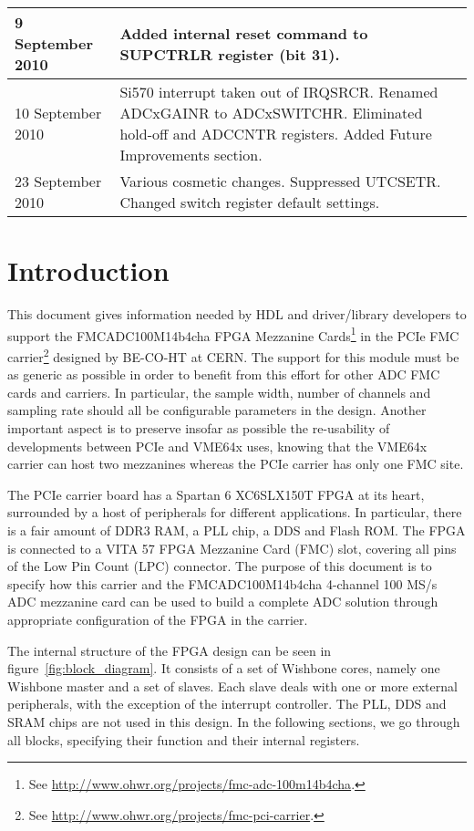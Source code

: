 \documentclass[a4paper]{article}
\begin{document}
\begin{table}[htbp]
\begin{tabularx}{\textwidth}{|l|X|}
    \hline
    9 September 2010 & Added internal reset command to SUPCTRLR register (bit 31).\\
    \hline
    10 September 2010 & Si570 interrupt taken out of IRQSRCR. Renamed ADCxGAINR to ADCxSWITCHR. Eliminated hold-off and ADCCNTR registers. Added Future Improvements section.\\
    \hline
    23 September 2010 & Various cosmetic changes. Suppressed UTCSETR. Changed switch register default settings.\\
    \hline
  \end{tabularx}
\end{table}

\newpage

\tableofcontents{}

\newpage

\section{Introduction}
This document gives information needed by HDL and driver/library developers to support the FMCADC100M14b4cha FPGA Mezzanine Cards\footnote{See \href{http://www.ohwr.org/projects/fmc-adc-100m14b4cha}{http://www.ohwr.org/projects/fmc-adc-100m14b4cha}.} in the PCIe FMC carrier\footnote{See \href{http://www.ohwr.org/projects/fmc-pci-carrier}{http://www.ohwr.org/projects/fmc-pci-carrier}.} designed by BE-CO-HT at CERN. The support for this module must be as generic as possible in order to benefit from this effort for other ADC FMC cards and carriers. In particular, the sample width, number of channels and sampling rate should all be configurable parameters in the design. Another important aspect is to preserve insofar as possible the re-usability of developments between PCIe and VME64x uses, knowing that the VME64x carrier can host two mezzanines whereas the PCIe carrier has only one FMC site.

The PCIe carrier board has a Spartan 6 XC6SLX150T FPGA at its heart, surrounded by a host of peripherals for different applications. In particular, there is a fair amount of DDR3 RAM, a PLL chip, a DDS and Flash ROM. The FPGA is connected to a VITA 57 FPGA Mezzanine Card (FMC) slot, covering all pins of the Low Pin Count (LPC) connector. The purpose of this document is to specify how this carrier and the FMCADC100M14b4cha 4-channel 100 MS/s ADC mezzanine card can be used to build a complete ADC solution through appropriate configuration of the FPGA in the carrier. 

The internal structure of the FPGA design can be seen in figure~\ref{fig:block_diagram}. It consists of a set of Wishbone cores, namely one Wishbone master and a set of slaves. Each slave deals with one or more external peripherals, with the exception of the interrupt controller. The PLL, DDS and SRAM chips are not used in this design. In the following sections, we go through all blocks, specifying their function and their internal registers.
\end{document}
